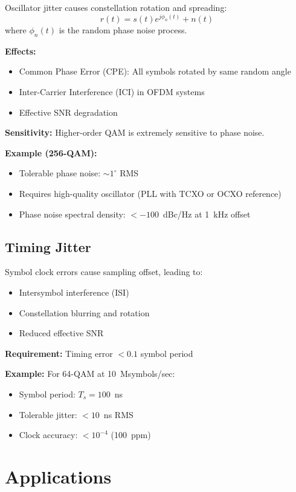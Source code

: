 Oscillator jitter causes constellation rotation and spreading:
\begin{equation}
r(t) = s(t) e^{j\phi_n(t)} + n(t)
\label{eq:phase-noise-model}
\end{equation}
where $\phi_n(t)$ is the random phase noise process.

\textbf{Effects:}
\begin{itemize}
\item Common Phase Error (CPE): All symbols rotated by same random angle
\item Inter-Carrier Interference (ICI) in OFDM systems
\item Effective SNR degradation
\end{itemize}

\textbf{Sensitivity:} Higher-order QAM is extremely sensitive to phase noise.

\textbf{Example (256-QAM):}
\begin{itemize}
\item Tolerable phase noise: $\sim 1^\circ$ RMS
\item Requires high-quality oscillator (PLL with TCXO or OCXO reference)
\item Phase noise spectral density: $< -100$~dBc/Hz at 1~kHz offset
\end{itemize}

\subsection{Timing Jitter}

Symbol clock errors cause sampling offset, leading to:
\begin{itemize}
\item Intersymbol interference (ISI)
\item Constellation blurring and rotation
\item Reduced effective SNR
\end{itemize}

\textbf{Requirement:} Timing error $< 0.1$ symbol period

\textbf{Example:} For 64-QAM at 10~Msymbols/sec:
\begin{itemize}
\item Symbol period: $T_s = 100$~ns
\item Tolerable jitter: $< 10$~ns RMS
\item Clock accuracy: $< 10^{-4}$ (100~ppm)
\end{itemize}

\section{Applications}

